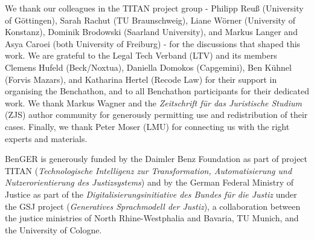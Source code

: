 \documentclass[11pt]{article}
\begin{document}
We thank our colleagues in the TITAN project group - Philipp Reuß
(University of Göttingen), Sarah Rachut (TU Braunschweig), Liane Wörner
(University of Konstanz), Dominik Brodowski (Saarland University), and
Markus Langer and Asya Caroei (both University of Freiburg) - for the
discussions that shaped this work. We are grateful to the Legal Tech
Verband (LTV) and its members Clemens Hufeld (Beck/Noxtua), Daniella
Domokos (Capgemini), Ben Kühnel (Forvis Mazars), and Katharina Hertel
(Recode Law) for their support in organising the Benchathon, and to all
Benchathon participants for their dedicated work. We thank Markus Wagner
and the \emph{Zeitschrift für das Juristische Studium} (ZJS) author
community for generously permitting use and redistribution of their
cases. Finally, we thank Peter Moser (LMU) for connecting us with the
right experts and materials.

BenGER is generously funded by the Daimler Benz Foundation as part of
project TITAN (\emph{Technologische Intelligenz zur Transformation,
Automatisierung und Nutzerorientierung des Justizsystems}) and by the
German Federal Ministry of Justice as part of the
\emph{Digitalisierungsinitiative des Bundes für die Justiz} under the
GSJ project (\emph{Generatives Sprachmodell der Justiz}), a
collaboration between the justice ministries of North Rhine-Westphalia
and Bavaria, TU Munich, and the University of Cologne.


\appendix
\nolinenumbers
\end{document}
